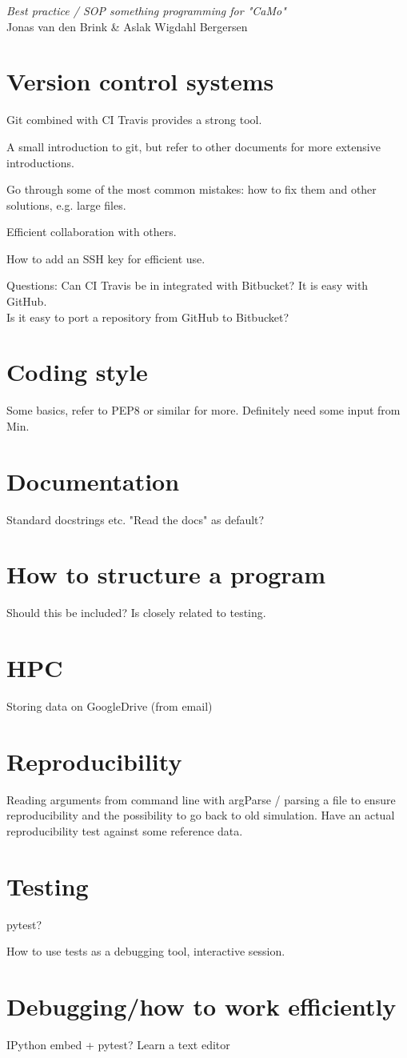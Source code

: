 \documentclass[11pt, a4paper, twoside]{report}
\begin{document}
\begingroup  
  \begin{center}
  \LARGE \textit{Best practice / SOP something programming for "CaMo"}\\[1.5em]
  \large Jonas van den Brink \& Aslak Wigdahl Bergersen \\
  \end{center}
\endgroup

\section*{Version control systems}
Git combined with CI Travis provides a strong tool.

A small introduction to git, but refer to other documents for more extensive introductions.

Go through some of the most common mistakes: how to fix them and other solutions, e.g. large files.

Efficient collaboration with others.

How to add an SSH key for efficient use.

Questions:
Can CI Travis be in integrated with Bitbucket? It is easy with GitHub.\\
Is it easy to port a repository from GitHub to Bitbucket?


\section*{Coding style}
Some basics, refer to PEP8 or similar for more. Definitely need some input from Min.


\section*{Documentation}
Standard docstrings etc.
"Read the docs" as default?


\section*{How to structure a program}
Should this be included? Is closely related to testing.


\section*{HPC}
Storing data on GoogleDrive (from email)


\section*{Reproducibility}
Reading arguments from command line with argParse / parsing a file to ensure reproducibility
and the possibility to go back to old simulation.
Have an actual reproducibility test against some reference data.

\section*{Testing}
pytest?

How to use tests as a debugging tool, interactive session.


\section*{Debugging/how to work efficiently}
IPython embed + pytest?
Learn a text editor
\end{document}
